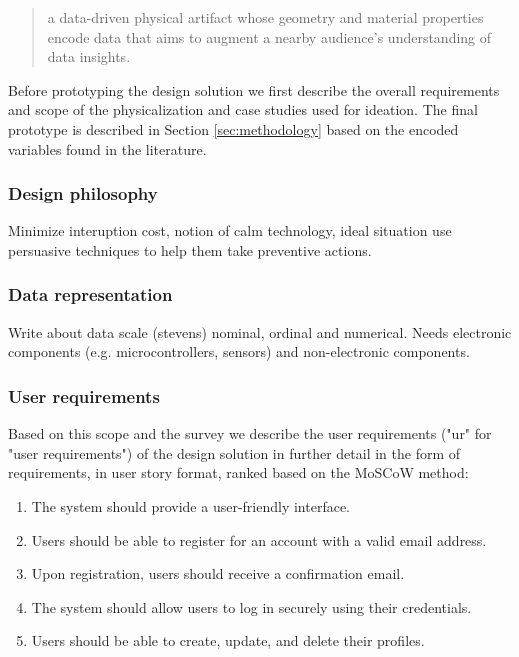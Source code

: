 \begin{quote}
a data-driven physical artifact whose geometry and material properties encode data that aims to augment a nearby audience’s understanding of data insights.
\end{quote}

Before prototyping the design solution we first describe the overall requirements and scope of the physicalization and case studies used for ideation. The final prototype is described in Section \ref{sec:methodology} based on the encoded variables found in the literature. 

\subsubsection{Design philosophy}

Minimize interuption cost, notion of calm technology, ideal situation use persuasive techniques to help them take preventive actions.

\subsubsection{Data representation}

Write about data scale (stevens) nominal, ordinal and numerical. Needs electronic components (e.g. microcontrollers, sensors) and non-electronic components.

\subsubsection{User requirements}

Based on this scope and the survey we describe the user requirements ("ur" for "user requirements") of the design solution in further detail in the form of requirements, in user story format, ranked based on the MoSCoW method:

\begin{enumerate}
    \renewcommand{\labelenumi}{UR\arabic{enumi}:}
    \item The system should provide a user-friendly interface.
    \item Users should be able to register for an account with a valid email address.
    \item Upon registration, users should receive a confirmation email.
    \item The system should allow users to log in securely using their credentials.
    \item Users should be able to create, update, and delete their profiles.
\end{enumerate}

